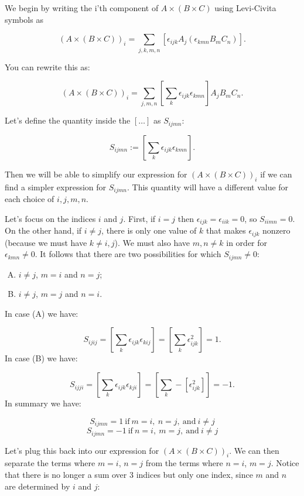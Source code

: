 We begin by writing the i'th component of $A \times (B \times C)$ using Levi-Civita symbols as %

\[ \left( A \times (B \times C) \right)_i =\sum_{j,k,m,n} \left[ \epsilon_{ijk} A_j( \epsilon_{kmn} B_m C_n )\right]. \]

You can rewrite this as: 

\[ \left( A \times (B \times C) \right)_i =  \sum_{j,m,n} \left[ \sum_k \epsilon_{ijk} \epsilon_{kmn} \right] A_j B_m C_n. \]

Let's define the quantity inside the $[ \dots ]$ as $S_{ijmn}$:

	\[ S_{ijmn} :=  \left[ \sum_k \epsilon_{ijk} \epsilon_{kmn} \right]. \]

Then we will be able to simplify our expression for $\left( A \times (B \times C) \right)_i$ if we can find a simpler expression for $S_{ijmn}$.  This quantity will have a different value for each choice of $i,j,m,n$.  

Let's focus on the indices $i$ and $j$. First, if $i=j$
then  $\epsilon_{ijk} =  \epsilon_{iik} = 0$, so $S_{iimn} = 0$.  On the other hand, if $i \neq j$, there is only one value of $k$ that makes $\epsilon_{ijk}$ nonzero (because we must have $k \neq i,j$). We must also have $m,n \neq k$ in 
order for $\epsilon_{kmn} \neq 0$.  It follows that there are two possibilities for which $S_{ijmn} \neq 0$:  
\begin{enumerate}[(A)]
\item
$i \neq j$, $m=i$ and $n=j$;
\item
$i \neq j$, $m=j$ and $n=i$.
\end{enumerate}

In case (A) we have:

\[ S_{ijij} =  \left[ \sum_k \epsilon_{ijk} \epsilon_{kij} \right] = \left[ \sum_k \epsilon_{ijk}^2 \right] = 1. \]
In case (B) we have:  

\[ S_{ijji} =  \left[ \sum_k \epsilon_{ijk} \epsilon_{kji} \right] = \left[ \sum_k -\left[\epsilon_{ijk}^2 \right] \right] = -1. \]
In summary we have:

\[ S_{ijmn} = 1 ~ \text{if}~ m=i,~ n=j, ~ \text{and}~ i\neq j \]
\[ S_{ijmn} = -1 ~ \text{if}~ n=i,~ m=j, ~ \text{and}~ i\neq j \]

Let's plug this back into our expression for $ \left( A \times (B \times C) \right)_i$. We can then separate the terms where $m=i$, $n=j$ from the terms where $n=i$, $m=j$. Notice that there is no longer a sum over 3 indices but 
only one index, since $m$ and $n$ are determined by $i$ and $j$:

